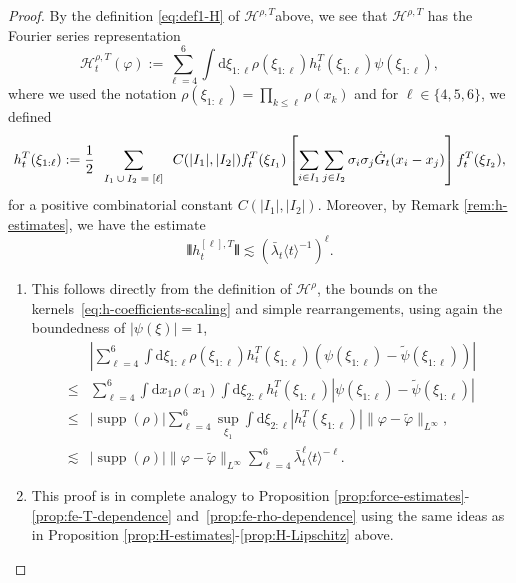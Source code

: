 \documentclass[11pt, a4paper]{scrartcl}
\numberwithin{equation}{section}
\theoremstyle{plain}
\theoremstyle{remark}
\newcommand{\assign}{:=}
\newcommand{\mathd}{\mathrm{d}}
\newcommand{\tmop}[1]{\ensuremath{\operatorname{#1}}}
\newcommand{\tmscript}[1]{\text{\scriptsize{$#1$}}}
\newenvironment{enumeratealpha}{\begin{enumerate}[a{\textup{)}}] }{\end{enumerate}}
\begin{document}
\begin{proof}
  By the definition \eqref{eq:def1-H} of $\mathcal{H}^{\rho, T}$above, we see
  that $\mathcal{H}^{\rho, T}$ has the Fourier series representation
  \begin{equation}
    \mathcal{H}_t^{\rho, T} (\varphi) \assign \sum_{\ell = 4}^6 \int \mathd
    \xi_{1 : \ell} \rho (\xi_{1 : \ell}) h^T_t (\xi_{1 : \ell}) \psi (\xi_{1 :
    \ell}), \label{eq:def-pot-remainder}
  \end{equation}
  where we used the notation $\rho (\xi_{1 : \ell}) = \prod_{k \leqslant \ell}
  \rho (x_k)$ and for $\ell \in \{ 4, 5, 6 \}$, we defined
  \begin{equation}
    h^T_t (\xi_{1 : \ell}) \assign \frac{1}{2} 
    \sum_{\tmscript{\begin{array}{c}
      I_1 \cup I_2 = [\ell]
    \end{array}}} C (| I_1 |, | I_2 |) f_t^T (\xi_{I_1}) \left[ \sum_{i \in
    I_1} \sum_{j \in I_2} \sigma_i \sigma_j  \dot{G}_t (x_i - x_j) \right]
    f_t^T (\xi_{I_2}), \label{eq:def-h-coefficients}
  \end{equation}
  for a positive combinatorial constant $C (| I_1 |, | I_2 |)$. Moreover, by
  Remark \ref{rem:h-estimates}, we have the estimate
  \begin{equation}
    \interleave h^{[\ell], T}_t \interleave \lesssim (\bar{\lambda}_t \langle t
    \rangle^{- 1})^{\ell} . \label{eq:h-coefficients-scaling}
  \end{equation}
  \begin{enumeratealpha}
    \item This follows directly from the definition of $\mathcal{H}^{\rho}$,
    the bounds on the kernels~\eqref{eq:h-coefficients-scaling} and simple
    rearrangements, using again the boundedness of $| \psi (\xi) | = 1$,
    \[ \begin{aligned}
         & \left| \sum_{\ell = 4}^6 \int \mathd \xi_{1 : \ell} \rho (\xi_{1 :
         \ell}) h^T_t (\xi_{1 : \ell}) (\psi (\xi_{1 : \ell}) - \tilde{\psi}
         (\xi_{1 : \ell})) \right|\\
         \leqslant & \sum_{\ell = 4}^6 \int \mathd x_1 \rho (x_1)  \int \mathd
         \xi_{2 : \ell} h^T_t (\xi_{1 : \ell}) | \psi (\xi_{1 : \ell}) -
         \tilde{\psi} (\xi_{1 : \ell}) |\\
         \leqslant & | \tmop{supp} (\rho) |  \sum_{\ell = 4}^6 \sup_{\xi_1} 
         \int \mathd \xi_{2 : \ell} | h^T_t (\xi_{1 : \ell}) |  \| \varphi -
         \tilde{\varphi} \|_{L^{\infty}},\\
         \lesssim & | \tmop{supp} (\rho) |  \| \varphi - \tilde{\varphi}
         \|_{L^{\infty}}  \sum_{\ell = 4}^6 \bar{\lambda}_t^{\ell} \langle t
         \rangle^{- \ell} .
       \end{aligned} \]
    \item This proof is in complete analogy to Proposition
    \ref{prop:force-estimates}-\ref{prop:fe-T-dependence}
    and~\ref{prop:fe-rho-dependence} using the same ideas as in Proposition
    \ref{prop:H-estimates}-\ref{prop:H-Lipschitz} above.
  \end{enumeratealpha}
\end{proof}
\end{document}
